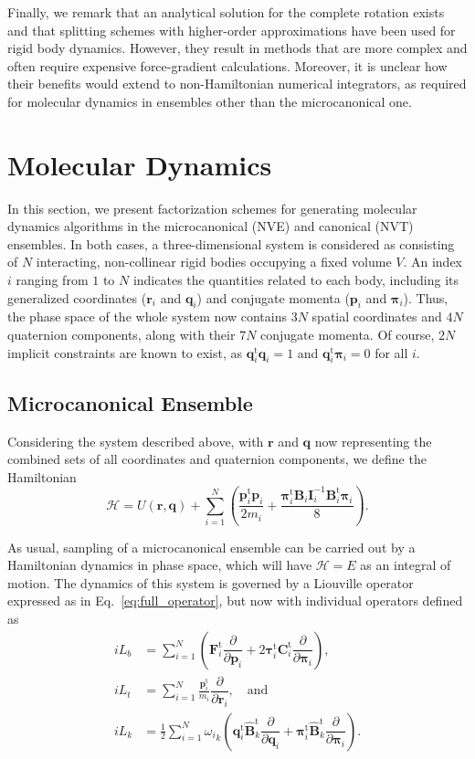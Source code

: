\documentclass[aip,jcp,reprint,amsmath,amssymb]{revtex4-1}
\newcommand{\mt}[1]{\boldsymbol{\mathbf{#1}}}           %
\newcommand{\vt}[1]{\boldsymbol{\mathbf{#1}}}           %
\newcommand{\tr}[1]{#1^\text{t}}                        %
\newcommand{\diff}[2]{\dfrac{\partial #1}{\partial #2}} %
\begin{document}
Finally, we remark that an analytical solution for the complete rotation exists\cite{vanZon2007} and that splitting schemes with higher-order approximations have been used for rigid body dynamics.\cite{Omelyan2007, Omelyan2008, vanZon2008} However, they result in methods that are more complex and often require expensive force-gradient calculations. Moreover, it is unclear how their benefits would extend to non-Hamiltonian numerical integrators, as required for molecular dynamics in ensembles other than the microcanonical one.

\section{Molecular Dynamics}
\label{sec:molecular_dynamics}

In this section, we present factorization schemes for generating molecular dynamics algorithms in the microcanonical (NVE) and canonical (NVT) ensembles. In both cases, a three-dimensional system is considered as consisting of $N$ interacting, non-collinear rigid bodies occupying a fixed volume $V$. An index $i$ ranging from $1$ to $N$ indicates the quantities related to each body, including its generalized coordinates ($\vt r_i$ and $\vt q_i$) and conjugate momenta ($\vt p_i$ and $\vt \pi_i$). Thus, the phase space of the whole system now contains $3N$ spatial coordinates and $4N$ quaternion components, along with their $7N$ conjugate momenta. Of course, $2N$ implicit constraints are known to exist, as $\tr{\vt q}_i{\vt q}_i = 1$ and $\tr{\vt q}_i{\vt \pi}_i = 0$ for all $i$.

\subsection{Microcanonical Ensemble}

Considering the system described above, with $\vt r$ and $\vt q$ now representing the combined sets of all coordinates and quaternion components, we define the Hamiltonian
\begin{equation}
\label{eq:H_NVE}
\mathcal{H} = U(\vt r,\vt q) + \sum_{i=1}^N \left(\frac{\tr{\vt p}_i{\vt p}_i}{2m_i} + \frac{\tr{\vt \pi}_i {\mt B}_i {\mt I}_i^{-1} \tr{\mt B}_i {\vt \pi}_i}{8}\right).
\end{equation}

As usual, sampling of a microcanonical ensemble can be carried out by a Hamiltonian dynamics in phase space, which will have $\mathcal{H} = E$ as an integral of motion. The dynamics of this system is governed by a Liouville operator expressed as in Eq.~\ref{eq:full_operator}, but now with individual operators defined as
\[
\begin{split}
i\!L_b &= \sum_{i=1}^N \left( \tr{\vt F}_i \diff{}{\vt p_i} + 2 \tr{\vt \tau}_i \tr{\mt C}_i \diff{}{\vt \pi_i} \right), \\
i\!L_t &= \sum_{i=1}^N \frac{\tr{\vt p}_i}{m_i}\diff{}{\vt r_i}, \quad \text{and} \\
i\!L_k &= \frac{1}{2} \sum_{i=1}^N {\omega_i}_k \left( \tr{\vt q}_i\tr{\hat{\mt B}_k} \diff{}{\vt q_i} + \tr{\vt \pi_i}\tr{\hat{\mt B}_k} \diff{}{\vt \pi_i} \right).
\end{split}
\]
\end{document}
